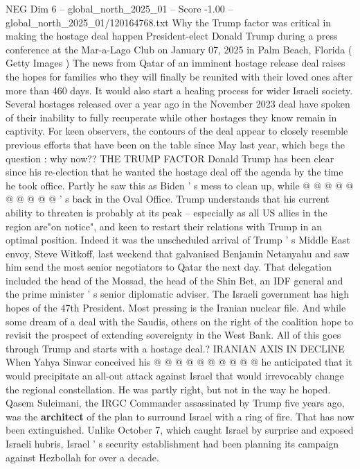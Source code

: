 \begin{textsample}{NEG Dim 6 – global\_north\_2025\_01 – Score -1.00 – global\_north\_2025\_01/120164768.txt}  \label{ex:f6_neg_098}
Why the Trump factor was critical in making the hostage deal happen President-elect Donald Trump during a press conference at the Mar-a-Lago Club on January 07, 2025 in Palm Beach, Florida ( Getty Images ) The news from Qatar of an imminent hostage release deal raises the hopes for families who they will finally be reunited with their loved ones after more than 460 days.
It would also start a healing process for wider Israeli society.
Several hostages released over a year ago in the November 2023 deal have spoken of their inability to fully recuperate while other hostages they know remain in captivity.
For keen observers, the contours of the deal appear to closely resemble previous efforts that have been on the table since May last year, which begs the question : why now??
THE TRUMP FACTOR Donald Trump has been clear since his re-election that he wanted the hostage deal off the agenda by the time he took office.
Partly he saw this as Biden ' s mess to clean up, while @ @ @ @ @ @ @ @ @ @ ' s back in the Oval Office.
Trump understands that his current ability to threaten is probably at its peak -- especially as all US allies in the region are"on notice", and keen to restart their relations with Trump in an optimal position.
Indeed it was the unscheduled arrival of Trump ' s Middle East envoy, Steve Witkoff, last weekend that galvanised Benjamin Netanyahu and saw him send the most senior negotiators to Qatar the next day.
That delegation included the head of the Mossad, the head of the Shin Bet, an IDF general and the prime minister ' s senior diplomatic adviser.
The Israeli government has high hopes of the 47th President.
Most pressing is the Iranian nuclear file.
And while some dream of a deal with the Saudis, others on the right of the coalition hope to revisit the prospect of extending sovereignty in the West Bank.
All of this goes through Trump and starts with a hostage deal.?
IRANIAN AXIS IN DECLINE When Yahya Sinwar conceived his @ @ @ @ @ @ @ @ @ @ he anticipated that it would precipitate an all-out attack against Israel that would irrevocably change the regional constellation.
He was partly right, but not in the way he hoped.
Qasem Suleimani, the IRGC Commander assassinated by Trump five years ago, was the \textbf{architect} of the plan to surround Israel with a ring of fire.
That has now been extinguished.
Unlike October 7, which caught Israel by surprise and exposed Israeli hubris, Israel ' s security establishment had been planning its campaign against Hezbollah for over a decade.

\end{textsample}
